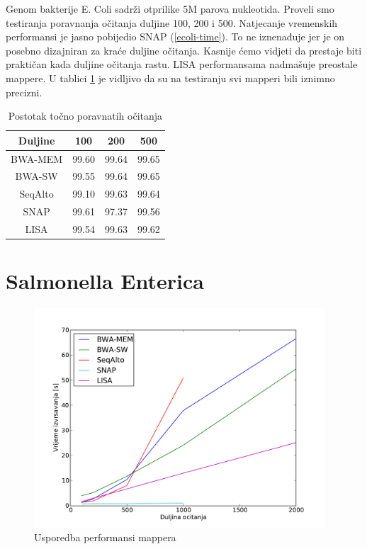 \documentclass[times, utf8, diplomski]{fer}
\begin{document}
Genom bakterije E. Coli sadrži otprilike 5M parova nukleotida. Proveli smo testiranja poravnanja očitanja duljine 100, 200 i 500. Natjecanje vremenskih performansi je jasno pobijedio SNAP (\ref{ecoli-time}). To ne iznenađuje jer je on posebno dizajniran za kraće duljine očitanja. Kasnije ćemo vidjeti da prestaje biti praktičan kada duljine očitanja rastu. LISA performansama nadmašuje preostale mappere. U tablici \ref{ecoli-correct} je vidljivo da su na testiranju svi mapperi bili iznimno precizni.

\begin{table}[H]
\centering
\begin{tabular}{|c||c|c|c|}
\hline
	Duljine & 100 & 200 & 500\\
\hline
\hline
	BWA-MEM & 99.60 & 99.64 & 99.65\\
\hline
	BWA-SW  & 99.55 & 99.64 & 99.65\\
\hline
	SeqAlto & 99.10 & 99.63 & 99.64\\
\hline
	SNAP    & 99.61 & 97.37 & 99.56\\
\hline
	LISA    & 99.54 & 99.63 & 99.62\\
\hline
\end{tabular}
\caption{Postotak točno poravnatih očitanja}\label{ecoli-correct}
\end{table}


\section {Salmonella Enterica}

\begin{figure}[H]
\centering
\includegraphics[width=0.97\textwidth]{../img/salmonella-time.pdf}
\caption{Usporedba performansi mappera}\label{salmonella-time}
\end{figure}
\end{document}
